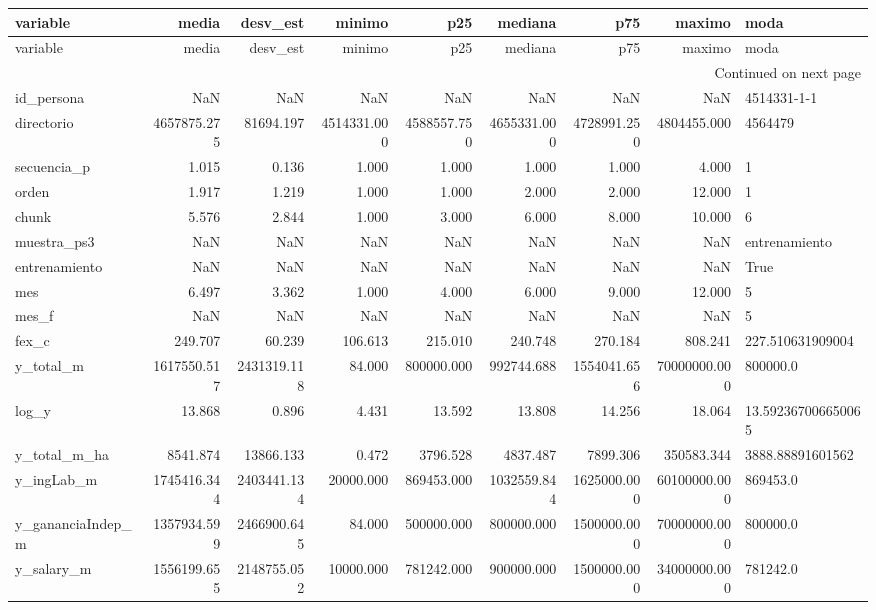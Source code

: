 \begin{longtable}{lrrrrrrrl}
\toprule
variable & media & desv\_est & minimo & p25 & mediana & p75 & maximo & moda \\
\midrule
\endfirsthead
\toprule
variable & media & desv\_est & minimo & p25 & mediana & p75 & maximo & moda \\
\midrule
\endhead
\midrule
\multicolumn{9}{r}{Continued on next page} \\
\midrule
\endfoot
\bottomrule
\endlastfoot
id\_persona & NaN & NaN & NaN & NaN & NaN & NaN & NaN & 4514331-1-1 \\
directorio & 4657875.275 & 81694.197 & 4514331.000 & 4588557.750 & 4655331.000 & 4728991.250 & 4804455.000 & 4564479 \\
secuencia\_p & 1.015 & 0.136 & 1.000 & 1.000 & 1.000 & 1.000 & 4.000 & 1 \\
orden & 1.917 & 1.219 & 1.000 & 1.000 & 2.000 & 2.000 & 12.000 & 1 \\
chunk & 5.576 & 2.844 & 1.000 & 3.000 & 6.000 & 8.000 & 10.000 & 6 \\
muestra\_ps3 & NaN & NaN & NaN & NaN & NaN & NaN & NaN & entrenamiento \\
entrenamiento & NaN & NaN & NaN & NaN & NaN & NaN & NaN & True \\
mes & 6.497 & 3.362 & 1.000 & 4.000 & 6.000 & 9.000 & 12.000 & 5 \\
mes\_f & NaN & NaN & NaN & NaN & NaN & NaN & NaN & 5 \\
fex\_c & 249.707 & 60.239 & 106.613 & 215.010 & 240.748 & 270.184 & 808.241 & 227.510631909004 \\
y\_total\_m & 1617550.517 & 2431319.118 & 84.000 & 800000.000 & 992744.688 & 1554041.656 & 70000000.000 & 800000.0 \\
log\_y & 13.868 & 0.896 & 4.431 & 13.592 & 13.808 & 14.256 & 18.064 & 13.592367006650065 \\
y\_total\_m\_ha & 8541.874 & 13866.133 & 0.472 & 3796.528 & 4837.487 & 7899.306 & 350583.344 & 3888.88891601562 \\
y\_ingLab\_m & 1745416.344 & 2403441.134 & 20000.000 & 869453.000 & 1032559.844 & 1625000.000 & 60100000.000 & 869453.0 \\
y\_gananciaIndep\_m & 1357934.599 & 2466900.645 & 84.000 & 500000.000 & 800000.000 & 1500000.000 & 70000000.000 & 800000.0 \\
y\_salary\_m & 1556199.655 & 2148755.052 & 10000.000 & 781242.000 & 900000.000 & 1500000.000 & 34000000.000 & 781242.0 \\

\end{longtable}

